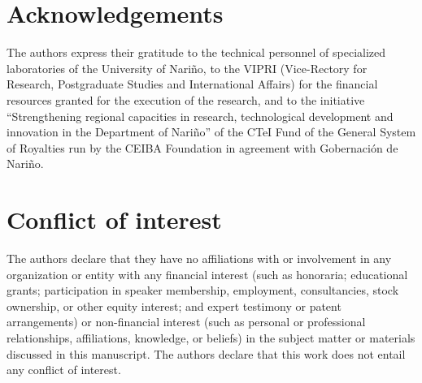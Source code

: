 \documentclass{univsciauth}
\begin{document}
\section{Acknowledgements}

The authors express their gratitude to the technical personnel of
specialized laboratories of the University of Nariño, to the VIPRI
(Vice-Rectory for Research, Postgraduate Studies and International
Affairs) for the financial resources granted for the execution of the
research, and to the initiative ``Strengthening regional capacities in
research, technological development and innovation in the Department of
Nariño'' of the CTeI Fund of the General System of Royalties run by the
CEIBA Foundation in agreement with Gobernación de Nariño.

\section{Conflict of interest}

The authors declare that they have no affiliations with or involvement
in any organization or entity with any financial interest (such as
honoraria; educational grants; participation in speaker membership,
employment, consultancies, stock ownership, or other equity interest;
and expert testimony or patent arrangements) or non-financial interest
(such as personal or professional relationships, affiliations,
knowledge, or beliefs) in the subject matter or materials discussed in
this manuscript. The authors declare that this work does not entail any
conflict of interest.


\clearpage
\end{document}
